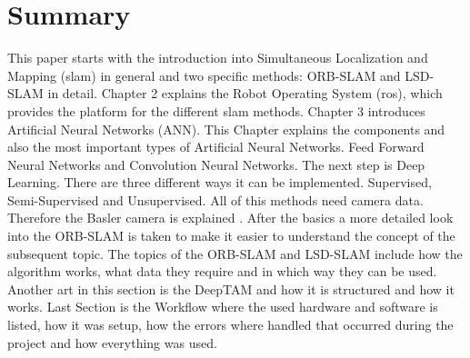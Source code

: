 

\chapter*{Summary}

This paper starts with the introduction into Simultaneous Localization and Mapping (\gls{slam}) in general and two specific methods: ORB-SLAM and LSD-SLAM in detail. \newline
Chapter 2 explains the Robot Operating System (\gls{ros}), which provides the platform for the different \gls{slam} methods. Chapter 3 introduces Artificial Neural Networks (ANN). This Chapter explains the components and also the most important types of Artificial Neural Networks. Feed Forward Neural Networks and Convolution Neural Networks. The next step is Deep Learning. There are three different ways it can be implemented. Supervised, Semi-Supervised and Unsupervised. All of this methods need camera data. Therefore the Basler camera is explained . \newline
After the basics a more detailed look into the ORB-SLAM is taken to make it easier to understand the concept of the subsequent topic. The topics of the ORB-SLAM and LSD-SLAM include how the algorithm works, what data they require and in which way they can be used. Another art in this section is the DeepTAM and how it is structured and how it works. \newline
Last Section is the Workflow where the used hardware and software is listed, how it was setup, how the errors where handled that occurred during the project and how everything was used.